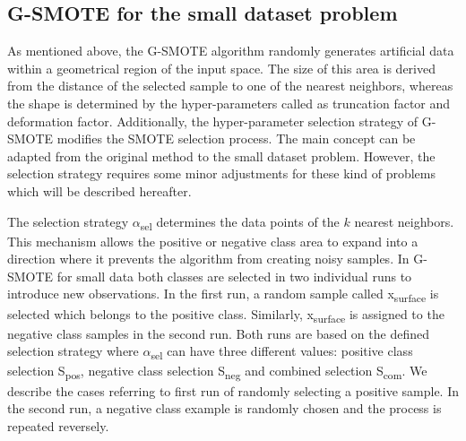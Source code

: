 \documentclass[parskip=full]{scrartcl}
\begin{document}
\subsection{G-SMOTE for the small dataset problem}

As mentioned above, the G-SMOTE algorithm randomly generates artificial data
within a geometrical region of the input space. The size of this area is derived
from the distance of the selected sample to one of the nearest neighbors,
whereas the shape is determined by the hyper-parameters called as truncation
factor and deformation factor. Additionally, the hyper-parameter selection
strategy of G-SMOTE modifies the SMOTE selection process. The main concept can
be adapted from the original method to the small dataset problem. However, the
selection strategy requires some minor adjustments for these kind of problems
which will be described hereafter.

The selection strategy $\alpha$\textsubscript{sel} determines the data points 
of the $\mathit{k}$ nearest neighbors. This mechanism allows the positive or 
negative class area to expand into a direction where it prevents the algorithm 
from creating noisy samples. In G-SMOTE for small data both classes are 
selected in two individual runs to introduce new observations. In the first 
run, a random sample called x\textsubscript{surface} is selected which belongs 
to the positive class. Similarly, x\textsubscript{surface} is assigned to the 
negative class samples in the second run. Both runs are based on the defined 
selection strategy where $\alpha$\textsubscript{sel} can have three different 
values: positive class selection S\textsubscript{pos}, negative class selection 
S\textsubscript{neg} and combined selection S\textsubscript{com}. We describe 
the cases referring to first run of randomly selecting a positive sample. In 
the second run, a negative class example is randomly chosen and the process is 
repeated reversely. 
\end{document}
